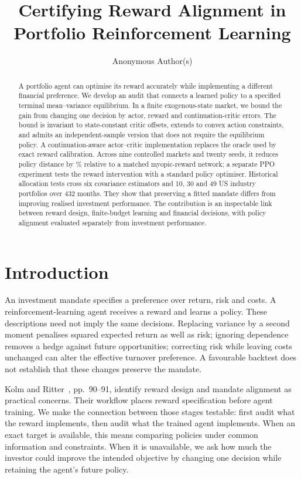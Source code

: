 \documentclass[sigconf,anonymous,review]{acmart}
\title{Certifying Reward Alignment in Portfolio Reinforcement Learning}
\author{Anonymous Author(s)}
\begin{document}
\begin{abstract}
A portfolio agent can optimise its reward accurately while implementing a different financial preference. We develop an audit that connects a learned policy to a specified terminal mean--variance equilibrium. In a finite exogenous-state market, we bound the gain from changing one decision by actor, reward and continuation-critic errors. The bound is invariant to state-constant critic offsets, extends to convex action constraints, and admits an independent-sample version that does not require the equilibrium policy. A continuation-aware actor--critic implementation replaces the oracle used by exact reward calibration. Across nine controlled markets and twenty seeds, it reduces policy distance by \DistanceReduction\% relative to a matched myopic-reward network; a separate PPO experiment tests the reward intervention with a standard policy optimiser. Historical allocation tests cross six covariance estimators and 10, 30 and 49 US industry portfolios over 432 months. They show that preserving a fitted mandate differs from improving realised investment performance. The contribution is an inspectable link between reward design, finite-budget learning and financial decisions, with policy alignment evaluated separately from investment performance.
\end{abstract}
\maketitle

\section{Introduction}
An investment mandate specifies a preference over return, risk and costs. A reinforcement-learning agent receives a reward and learns a policy. These descriptions need not imply the same decisions. Replacing variance by a second moment penalises squared expected return as well as risk; ignoring dependence removes a hedge against future opportunities; correcting risk while leaving costs unchanged can alter the effective turnover preference. A favourable backtest does not establish that these changes preserve the mandate.

Kolm and Ritter~\cite{kolm2025}, pp.~90--91, identify reward design and mandate alignment as practical concerns. Their workflow places reward specification before agent training. We make the connection between those stages testable: first audit what the reward implements, then audit what the trained agent implements. When an exact target is available, this means comparing policies under common information and constraints. When it is unavailable, we ask how much the investor could improve the intended objective by changing one decision while retaining the agent's future policy.
\end{document}
